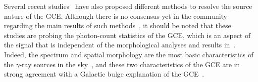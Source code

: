 \documentclass[doublespace,nopageskip]{VTthesis} %
\begin{document}
Several recent studies~\cite[e.g.,][]{Lee:2015fea,Bartels:2015aea, Leane:2019xiy,Balaji:2018rwz,Chang:2019ars,Leane:2020pfc,Leane:2020nmi,Buschmann:2020adf,Calore:2021bty} have also proposed different methods to resolve the source nature of the GCE. Although there is no consensus yet in the community regarding the main results of such methods~\cite[e.g.,][]{Leane:2020pfc,Leane:2020nmi,Buschmann:2020adf,Bartels:2015aea,Balaji:2018rwz}, it should be noted that these studies are probing the photon-count statistics of the GCE, which is an aspect of the signal that is independent of the morphological analyses and results in~\citep{Macias:2016nev,Bartels:2017vsx, Macias:2019omb}. Indeed, the spectrum and spatial morphology are the most basic characteristics of the $\gamma$-ray sources in the sky~\citep{Fermi-LAT:4FGL}, and these two characteristics of the GCE are in strong agreement with a Galactic bulge explanation of the GCE~\cite[e.g.,][]{Abazajian:2020tww}. 
\end{document}
